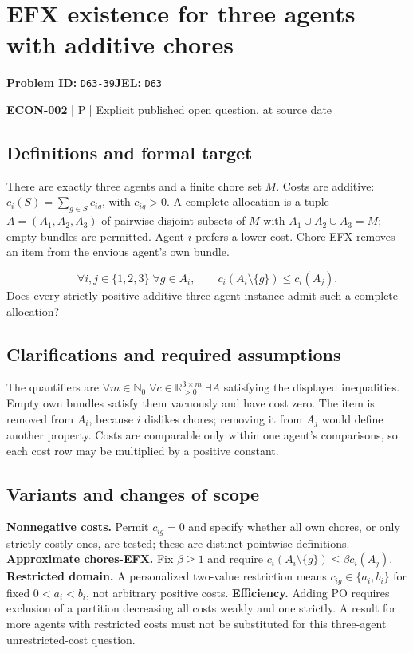 \documentclass[11pt,a4paper]{article}
\begin{document}
\section*{EFX existence for three agents with additive chores}
\textbf{Problem ID:} \texttt{D63-39}\quad \textbf{JEL:} \texttt{D63}\par
\label{problem:OP-0589}


\label{audited:ECON-002}

{\sffamily\small\color{muted}\textbf{ECON-002} | P | Explicit published open question, at source date\par}

\subsection*{Definitions and formal target}

There are exactly three agents and a finite chore set $M$. Costs are additive: $c_i(S)=\sum_{g\in S}c_{ig}$, with $c_{ig}>0$. A complete allocation is a tuple $A=(A_1,A_2,A_3)$ of pairwise disjoint subsets of $M$ with $A_1\cup A_2\cup A_3=M$; empty bundles are permitted. Agent $i$ prefers a lower cost. Chore-EFX removes an item from the envious agent's own bundle.

\[
 \forall i,j\in\{1,2,3\}\;\forall g\in A_i,
 \qquad c_i(A_i\setminus\{g\})\leq c_i(A_j).
\]
Does every strictly positive additive three-agent instance admit such a complete allocation?

\subsection*{Clarifications and required assumptions}

The quantifiers are $\forall m\in\mathbb N_0\;\forall c\in\mathbb R_{>0}^{3\times m}\;\exists A$ satisfying the displayed inequalities. Empty own bundles satisfy them vacuously and have cost zero. The item is removed from $A_i$, because $i$ dislikes chores; removing it from $A_j$ would define another property. Costs are comparable only within one agent's comparisons, so each cost row may be multiplied by a positive constant.

\subsection*{Variants and changes of scope}

\textbf{Nonnegative costs.} Permit $c_{ig}=0$ and specify whether all own chores, or only strictly costly ones, are tested; these are distinct pointwise definitions. \textbf{Approximate chores-EFX.} Fix $\beta\geq1$ and require $c_i(A_i\setminus\{g\})\leq\beta c_i(A_j)$. \textbf{Restricted domain.} A personalized two-value restriction means $c_{ig}\in\{a_i,b_i\}$ for fixed $0<a_i<b_i$, not arbitrary positive costs. \textbf{Efficiency.} Adding PO requires exclusion of a partition decreasing all costs weakly and one strictly. A result for more agents with restricted costs must not be substituted for this three-agent unrestricted-cost question.
\end{document}
